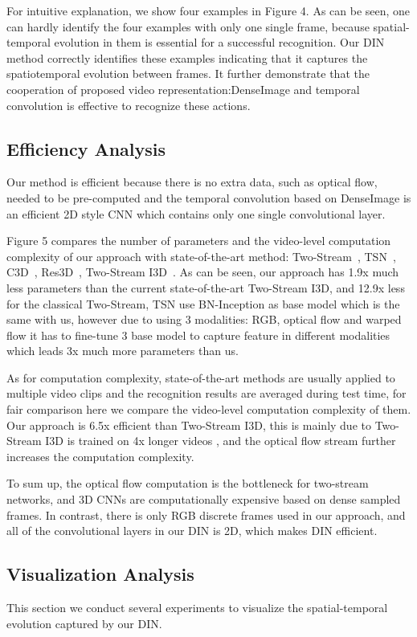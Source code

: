 \documentclass{article}
\begin{document}
For intuitive explanation, we show four examples in Figure 4. As can be seen, one can hardly identify the four examples with only one single frame, because spatial-temporal evolution in them is essential for a successful recognition. Our DIN method correctly identifies these examples indicating that it captures the spatiotemporal evolution between frames. It further demonstrate that the cooperation of proposed video representation:DenseImage and temporal convolution is effective to recognize these actions.

\subsection{Efficiency Analysis}
Our method is efficient because there is no extra data, such as optical flow, needed to be pre-computed and the temporal convolution based on DenseImage is an efficient 2D style CNN which contains only one single convolutional layer. 

Figure 5 compares the number of parameters and the video-level computation complexity of our approach with state-of-the-art method: Two-Stream~\cite{SimonyanZ14}, TSN~\cite{WangXW0LTG16}, C3D~\cite{TranBFTP15}, Res3D~\cite{abs-1708-05038}, Two-Stream I3D~\cite{CarreiraZ17}. As can be seen, our approach has 1.9x much less parameters than the current state-of-the-art Two-Stream I3D, and 12.9x less for the classical Two-Stream, TSN use BN-Inception as base model which is the same with us, however due to using 3 modalities: RGB, optical flow and warped flow it has to fine-tune 3 base model to capture feature in different modalities which leads 3x much more parameters than us. 

As for computation complexity, state-of-the-art methods are usually applied to multiple video clips and the recognition results are averaged during test time, for fair comparison here we compare the video-level computation complexity of them. Our approach is 6.5x efficient than Two-Stream I3D, this is mainly due to Two-Stream I3D is trained on 4x longer videos , and the optical flow stream further increases the computation complexity. 

To sum up, the optical flow computation is the bottleneck for two-stream networks, and 3D CNNs are computationally expensive based on dense sampled frames. In contrast, there is only RGB discrete frames used in our approach, and all of the convolutional layers in our DIN is 2D, which makes DIN efficient.

\subsection{Visualization Analysis}
This section we conduct several experiments to visualize the spatial-temporal evolution captured by our DIN.
\end{document}
